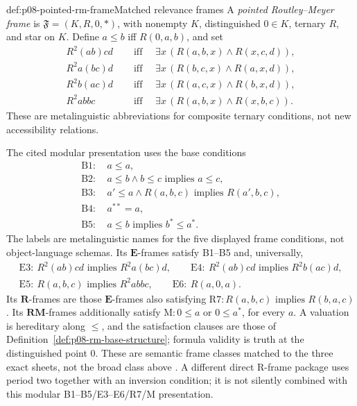 \begin{hbdefinition}{def:p08-pointed-rm-frame}{Matched relevance frames}
A \emph{pointed Routley--Meyer frame} is
\(\mathfrak F=(K,R,0,{*})\), with nonempty \(K\), distinguished
\(0\in K\), ternary \(R\), and star on \(K\).  Define
\(a\leq b\) iff \(R(0,a,b)\), and set
\[
\begin{aligned}
 R^2(ab)cd &\quad\text{ iff }\quad
   \exists x\,(R(a,b,x)\land R(x,c,d)),\\
 R^2a(bc)d &\quad\text{ iff }\quad
   \exists x\,(R(b,c,x)\land R(a,x,d)),\\
 R^2b(ac)d &\quad\text{ iff }\quad
   \exists x\,(R(a,c,x)\land R(b,x,d)),\\
 R^2abbc &\quad\text{ iff }\quad
   \exists x\,(R(a,b,x)\land R(x,b,c)).
\end{aligned}
\]
These are metalinguistic abbreviations for composite ternary conditions, not
new accessibility relations.

The cited modular presentation uses the base conditions
\begin{align*}
 \mathrm{B1}:&\ a\leq a,\\
 \mathrm{B2}:&\ a\leq b\land b\leq c\text{ implies }a\leq c,\\
 \mathrm{B3}:&\ a'\leq a\land R(a,b,c)\text{ implies }R(a',b,c),\\
 \mathrm{B4}:&\ a^{**}=a,\\
 \mathrm{B5}:&\ a\leq b\text{ implies }b^*\leq a^*.
\end{align*}
The labels are metalinguistic names for the five displayed frame conditions,
not object-language schemas.  Its \(\mathbf E\)-frames satisfy
B1--B5 and, universally,
\[
\begin{gathered}
 \mathrm{E3}:\ R^2(ab)cd\text{ implies }R^2a(bc)d,\qquad
 \mathrm{E4}:\ R^2(ab)cd\text{ implies }R^2b(ac)d,\\
 \mathrm{E5}:\ R(a,b,c)\text{ implies }R^2abbc,\qquad
 \mathrm{E6}:\ R(a,0,a).
\end{gathered}
\]
Its \(\mathbf R\)-frames are those \(\mathbf E\)-frames also
satisfying \(\mathrm{R7}: R(a,b,c)\text{ implies }R(b,a,c)\).  Its
\(\mathbf{RM}\)-frames additionally satisfy
\(\mathrm{M}: 0\leq a\) or \(0\leq a^*\), for every \(a\).  A valuation is
hereditary along \(\leq\), and the satisfaction clauses are those of
Definition~\ref{def:p08-rm-base-structure}; formula validity is truth at the
distinguished point \(0\).  These are semantic frame classes matched to the
three exact sheets, not the broad class above
\cite{RoutleyMeyer1973,DunnRestall2002}.  A different direct R-frame package
uses period two together with an inversion condition; it is not silently
combined with this modular B1--B5/E3--E6/R7/M presentation.
\end{hbdefinition}

